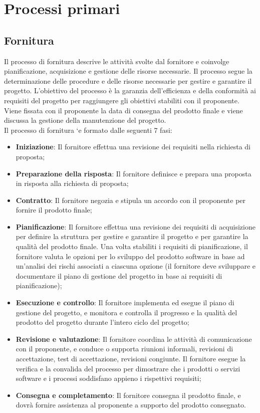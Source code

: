 \documentclass[10pt, a4paper]{article}
\begin{document}
\newpage
\section{Processi primari}
\subsection{Fornitura}
Il processo di fornitura descrive le attività svolte dal fornitore e coinvolge pianificazione, acquisizione e gestione delle risorse necessarie. Il processo segue la determinazione delle procedure e delle risorse necessarie per gestire e garantire il progetto.
L'obiettivo del processo è la garanzia dell'efficienza e della conformità ai requisiti del progetto per raggiungere gli obiettivi stabiliti con il proponente.\\
Viene fissata con il proponente la data di consegna del prodotto finale e viene discussa la gestione della manutenzione del progetto.\\
Il processo di fornitura `e formato dalle seguenti 7 fasi:
\begin{itemize}
    \item \textbf{Iniziazione}: Il fornitore effettua una revisione dei requisiti nella richiesta di proposta;
    \item \textbf{Preparazione della risposta}: Il fornitore definisce e prepara una proposta in risposta alla richiesta di proposta;
    \item \textbf{Contratto}: Il fornitore negozia e stipula un accordo con il proponente per fornire il prodotto finale;
    \item \textbf{Pianificazione}: Il fornitore  effettua una revisione dei requisiti di acquisizione per definire la struttura per gestire e garantire il progetto e per garantire la qualità del prodotto finale. Una volta stabiliti i requisiti di pianificazione, il fornitore valuta le opzioni per lo sviluppo del prodotto software in base ad un'analisi dei rischi associati a ciascuna opzione (il fornitore deve sviluppare e documentare il piano di gestione del progetto in base ai requisiti di pianificazione);
    \item \textbf{Esecuzione e controllo}: Il fornitore implementa ed esegue il piano di gestione del progetto, e monitora e controlla il progresso e la qualità del prodotto del progetto durante l'intero ciclo del progetto;
    \item \textbf{Revisione e valutazione}: Il fornitore coordina le attività di comunicazione con il proponente, e conduce o supporta riunioni informali, revisioni di accettazione, test di accettazione, revisioni congiunte. Il fornitore  esegue la verifica e la convalida del processo per dimostrare che i prodotti o servizi software e i processi soddisfano appieno i rispettivi requisiti;
    \item \textbf{Consegna e completamento}: Il fornitore consegna il prodotto finale, e dovrà fornire assistenza al proponente a supporto del prodotto consegnato.
\end{itemize}
\end{document}
